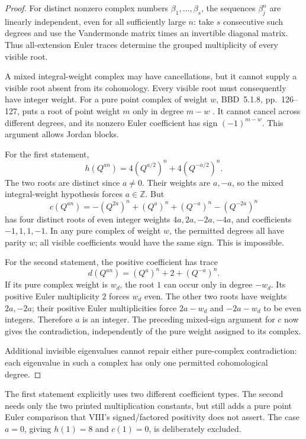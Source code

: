 \documentclass[11pt,a4paper]{article}
\theoremstyle{named}\newtheorem{finding}{Finding}[section]
\theoremstyle{definition}\newtheorem{definition}[finding]{Definition}
\theoremstyle{remark}\newtheorem{remark}[finding]{Remark}
\begin{document}
\begin{proof}
For distinct nonzero complex numbers \(\beta_1,\ldots,\beta_s\),
the sequences \(\beta_j^n\) are linearly independent,
even for all sufficiently large \(n\): take \(s\)
consecutive such degrees and use the Vandermonde matrix
times an invertible diagonal matrix.
Thus all-extension Euler traces determine the grouped
multiplicity of every visible root.

A mixed integral-weight complex may have cancellations,
but it cannot supply a visible root absent from its
cohomology. Every visible root must consequently have
integer weight.
For a pure point complex of weight \(w\), BBD~5.1.8,
pp.~126--127, puts a root of point weight \(m\)
only in degree \(m-w\) \cite{BBD}.
It cannot cancel across different degrees, and its
nonzero Euler coefficient has sign \((-1)^{m-w}\).
This argument allows Jordan blocks.

For the first statement,
\[
             h(Q^{an})=4(Q^{a/2})^n+4(Q^{-a/2})^n.
\]
The two roots are distinct since \(a\ne0\). Their weights
are \(a,-a\), so the mixed integral-weight hypothesis
forces \(a\in\mathbb Z\). But
\[
 c(Q^{an})=-(Q^{2a})^n+(Q^a)^n
                  +(Q^{-a})^n-(Q^{-2a})^n
\]
has four distinct roots of even integer weights
\(4a,2a,-2a,-4a\), and coefficients \(-1,1,1,-1\).
In any pure complex of weight \(w\), the permitted
degrees all have parity \(w\); all visible coefficients
would have the same sign. This is impossible.

For the second statement, the positive coefficient has
trace
\[
                     d(Q^{an})=(Q^a)^n+2+(Q^{-a})^n.
\]
If its pure complex weight is \(w_d\), the root \(1\)
can occur only in degree \(-w_d\). Its positive Euler
multiplicity \(2\) forces \(w_d\) even.
The other two roots have weights \(2a,-2a\); their
positive Euler multiplicities force
\(2a-w_d\) and \(-2a-w_d\) to be even integers.
Therefore \(a\) is an integer. The preceding
mixed-sign argument for \(c\) now gives the contradiction,
independently of the pure weight assigned to its complex.

Additional invisible eigenvalues cannot repair either
pure-complex contradiction: each eigenvalue in such a
complex has only one permitted cohomological degree.
\end{proof}

The first statement explicitly uses two different coefficient
types. The second needs only the two printed multiplication
constants, but still adds a pure point Euler comparison
that VIII's signed/factored positivity does not assert.
The case \(a=0\), giving \(h(1)=8\) and \(c(1)=0\),
is deliberately excluded.
\end{document}
